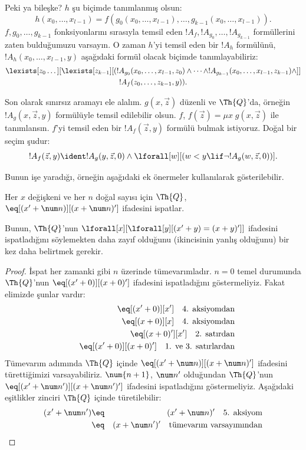 \documentclass[../../../include/open-logic-section]{subfiles}
\begin{document}
Peki ya bileşke? $h$ şu biçimde tanımlanmış olsun:
\[
h(x_0,\dots,x_{l-1}) = f(g_0(x_0,\dots,x_{l-1}), \dots,
g_{k-1}(x_0,\dots,x_{l-1})).
\]
$f,g_0,\dots,g_{k-1}$ fonksiyonlarını sırasıyla temsil eden
$!A_f, !A_{g_0}, \dots, !A_{g_{k-1}}$ formüllerini zaten bulduğumuzu
varsayın. O zaman $h$'yi temsil eden bir $!A_h$ formülünü,
$!A_h(x_0,\dots,x_{l-1},y)$ aşağıdaki formül olacak biçimde tanımlayabiliriz:
\begin{multline*}
  \lexists[z_0\dots][\lexists[z_{k-1}][(!A_{g_0}(x_0,\dots,x_{l-1},z_0) \land
  \dots \land !A_{g_{k-1}}(x_0,\dots,x_{l-1},z_{k-1}) \land]]\\
  !A_f(z_0,\dots,z_{k-1},y)).
\end{multline*}

Son olarak sınırsız aramayı ele alalım. $g(x,\vec z)$ düzenli ve
$\Th{Q}$'da, örneğin $!A_g(x,\vec z,y)$ formülüyle temsil edilebilir olsun.
$f$, $f(\vec z) = \mu x \; g(x,\vec z)$ ile tanımlansın. $f$'yi temsil eden
bir $!A_f(\vec z,y)$ formülü bulmak istiyoruz. Doğal bir seçim şudur:
\[
!A_f(\vec z,y) \ident !A_g(y,\vec z,0) \land \lforall[w][(w < y
\lif \lnot !A_g(w,\vec z,0))].
\]

Bunun işe yaradığı, örneğin aşağıdaki ek önermeler kullanılarak gösterilebilir.

\begin{lem}
  Her $x$ değişkeni ve her $n$ doğal sayısı için $\Th{Q}$,
  $\eq[(x' + \num n)][(x + \num n)']$ ifadesini ispatlar.
\end{lem}

Bunun, $\Th{Q}$'nun
$\lforall[x][\lforall[y][(x' + y) = (x +y)']]$ ifadesini ispatladığını
söylemekten daha zayıf olduğunu (ikincisinin yanlış olduğunu) bir kez daha
belirtmek gerekir.

\begin{proof}
İspat her zamanki gibi $n$ üzerinde tümevarımladır. $n=0$ temel durumunda
$\Th{Q}$'nun $\eq[(x'+0)][(x+0)']$ ifadesini ispatladığını göstermeliyiz.
Fakat elimizde şunlar vardır:
\begin{eqnarray*}
& & \eq[(x' + 0)][x'] \quad \text{4. aksiyomdan} \\
& & \eq[(x + 0)][x] \quad \text{4. aksiyomdan} \\
& & \eq[(x+0)'][x'] \quad \text{2. satırdan} \\
& & \eq[(x' + 0)][(x + 0)'] \quad \text{1. ve 3. satırlardan}
\end{eqnarray*}
Tümevarım adımında $\Th{Q}$ içinde
$\eq[(x' + \num n)][(x + \num n)']$ ifadesini türettiğimizi
varsayabiliriz. $\num{n+1}$, $\num n'$ olduğundan $\Th{Q}$'nun
$\eq[(x' + \num n')][(x + \num n')']$ ifadesini ispatladığını göstermeliyiz.
Aşağıdaki eşitlikler zinciri $\Th{Q}$ içinde türetilebilir:
\begin{eqnarray*}
(x' + \num n') & \eq & (x' + \num n)' \quad \text{5. aksiyom} \\
& \eq & (x + \num n')' \quad \text{tümevarım varsayımından}
\end{eqnarray*}
\end{proof}
\end{document}

